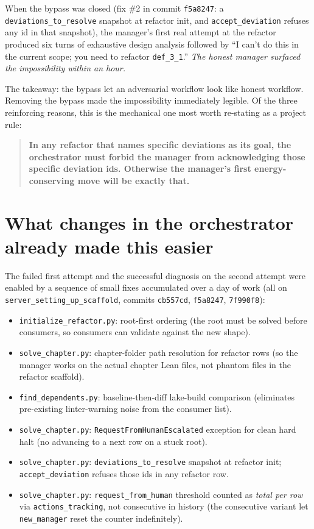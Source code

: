 \documentclass[11pt,a4paper]{article}
\begin{document}
When the bypass was closed (fix \#2 in commit \texttt{f5a8247}: a
\verb|deviations_to_resolve| snapshot at refactor init, and
\verb|accept_deviation| refuses any id in that snapshot), the
manager's first real attempt at the refactor produced six turns of
exhaustive design analysis followed by ``I can't do this in the
current scope; you need to refactor \texttt{def\_3\_1}.''
\emph{The honest manager surfaced the impossibility within an hour.}

The takeaway: the bypass let an adversarial workflow look like
honest workflow. Removing the bypass made the impossibility
immediately legible. Of the three reinforcing reasons, this is the
mechanical one most worth re-stating as a project rule:

\begin{quotation}\noindent
\textbf{In any refactor that names specific deviations as its goal,
the orchestrator must forbid the manager from acknowledging those
specific deviation ids. Otherwise the manager's first
energy-conserving move will be exactly that.}
\end{quotation}

\section{What changes in the orchestrator already made this easier}

The failed first attempt and the successful diagnosis on the second
attempt were enabled by a sequence of small fixes accumulated over a
day of work (all on \texttt{server\_setting\_up\_scaffold}, commits
\texttt{cb557cd}, \texttt{f5a8247}, \texttt{7f990f8}):

\begin{itemize}
  \item \texttt{initialize\_refactor.py}: root-first ordering (the
        root must be solved before consumers, so consumers can
        validate against the new shape).
  \item \texttt{solve\_chapter.py}: chapter-folder path resolution
        for refactor rows (so the manager works on the actual chapter
        Lean files, not phantom files in the refactor scaffold).
  \item \texttt{find\_dependents.py}: baseline-then-diff lake-build
        comparison (eliminates pre-existing linter-warning noise from
        the consumer list).
  \item \texttt{solve\_chapter.py}: \verb|RequestFromHumanEscalated|
        exception for clean hard halt (no advancing to a next row
        on a stuck root).
  \item \texttt{solve\_chapter.py}: \verb|deviations_to_resolve|
        snapshot at refactor init; \verb|accept_deviation| refuses
        those ids in any refactor row.
  \item \texttt{solve\_chapter.py}: \verb|request_from_human|
        threshold counted as \emph{total per row} via
        \verb|actions_tracking|, not consecutive in history (the
        consecutive variant let \verb|new_manager| reset the counter
        indefinitely).
\end{itemize}
\end{document}

